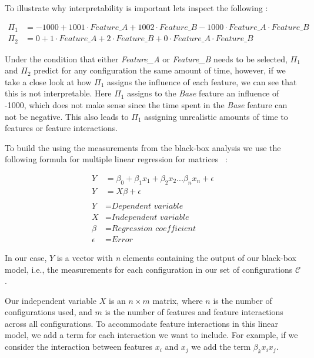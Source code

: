 To illustrate why interpretability is important lets inspect the following \perfInfluenceModel:

\begin{align*}
    \Pi_1 &= -1000 + 1001 \cdot \textit{Feature\_A} + 1002 \cdot \textit{Feature\_B} - 1000 \cdot \textit{Feature\_A} \cdot \textit{Feature\_B} \\
    \Pi_2 &= 0 + 1 \cdot \textit{Feature\_A} + 2 \cdot \textit{Feature\_B} + 0 \cdot \textit{Feature\_A} \cdot \textit{Feature\_B}
\end{align*}

Under the condition that either \textit{Feature\_A} or \textit{Feature\_B} needs to be selected, 
$\Pi_1$ and $\Pi_2$ predict for any configuration the same amount of time, however, 
if we take a close look at how $\Pi_1$ assigns the influence of each feature, we can see that this is not interpretable. 
Here $\Pi_1$ assigns to the \textit{Base} feature an influence of -1000, 
which does not make sense since the time spent in the \textit{Base} feature can not be negative. 
This also leads to $\Pi_1$ assigning unrealistic amounts of time to features or feature interactions. 

To build the {\perfInfluenceModel} using the measurements from the black-box analysis we use 
 the following formula for multiple linear regression for matrices ~\cite{Linear-Regression-Performance}:

\begin{align}\label{formula:linReg}
    Y &= \beta_0 + \beta_1 x_1 + \beta_2 x_2 ... \beta_n x_n + \epsilon   \\
    Y &= X \beta + \epsilon \nonumber\\ \nonumber \\ \nonumber
    Y &= \textit{Dependent variable}\\ \nonumber
    X &= \textit{Independent variable}\\ \nonumber
    \beta &= \textit{Regression coefficient}\\ \nonumber
    \epsilon &= \textit{Error} \nonumber
\end{align}

In our case, $Y$ is a vector with \textit{n}  elements containing the output of our black-box model,
i.e., the measurements for each configuration in our set of configurations $\mathcal{C}$. 

Our independent variable $X$ is an $n \times m$ matrix, where $n$ is the number of configurations used, 
and $m$ is the number of features and feature interactions across all configurations. 
To accommodate feature interactions in this linear model, we add a term for each interaction we want to include. 
For example, if we consider the interaction between features $x_i$ and $x_j$ we add the term $\beta_k x_i x_j$. 

